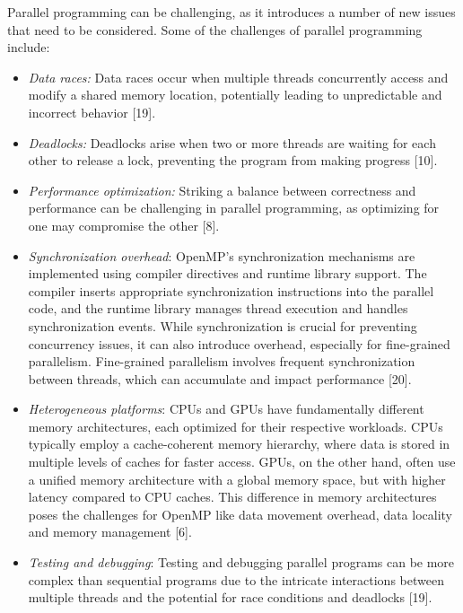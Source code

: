 \documentclass[12pt,conference]{IEEEtran}
\begin{document}
Parallel programming can be challenging, as it introduces a number of new issues that need to be considered. Some of the challenges of parallel programming include:
\begin{itemize}
    \item \textit{Data races:} Data races occur when multiple threads concurrently access and modify a shared memory location, potentially leading to unpredictable and incorrect behavior [19]. 
\end{itemize}
\begin{itemize}
    \item \textit{Deadlocks:} Deadlocks arise when two or more threads are waiting for each other to release a lock, preventing the program from making progress [10]. 
\end{itemize}
\begin{itemize}
    \item \textit{Performance optimization:} Striking a balance between correctness and performance can be challenging in parallel programming, as optimizing for one may compromise the other [8]. 
\end{itemize}

\begin{itemize}
    \item \textit{Synchronization overhead}: OpenMP's synchronization mechanisms are implemented using compiler directives and runtime library support. The compiler inserts appropriate synchronization instructions into the parallel code, and the runtime library manages thread execution and handles synchronization events. While synchronization is crucial for preventing concurrency issues, it can also introduce overhead, especially for fine-grained parallelism. Fine-grained parallelism involves frequent synchronization between threads, which can accumulate and impact performance [20]. 
\end{itemize}
\begin{itemize}
    \item \textit{Heterogeneous platforms}: CPUs and GPUs have fundamentally different memory architectures, each optimized for their respective workloads. CPUs typically employ a cache-coherent memory hierarchy, where data is stored in multiple levels of caches for faster access. GPUs, on the other hand, often use a unified memory architecture with a global memory space, but with higher latency compared to CPU caches. This difference in memory architectures poses the challenges for OpenMP like data movement overhead, data locality and memory management [6]. 
\end{itemize}
\begin{itemize}
    \item \textit{Testing and debugging}: Testing and debugging parallel programs can be more complex than sequential programs due to the intricate interactions between multiple threads and the potential for race conditions and deadlocks [19]. 
\end{itemize}
\end{document}
